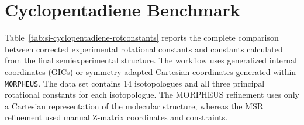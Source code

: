 \documentclass[12pt]{article}
\begin{document}
\section{Cyclopentadiene Benchmark}

Table~\ref{tab:si-cyclopentadiene-rotconstants} reports the complete
comparison between corrected experimental rotational constants and constants
calculated from the final semiexperimental structure. The workflow uses
generalized internal coordinates (GICs) or symmetry-adapted Cartesian
coordinates generated within \texttt{MORPHEUS}. The data set contains 14
isotopologues and all three principal rotational constants for each
isotopologue. The MORPHEUS refinement uses only a Cartesian representation of the
molecular structure, whereas the MSR refinement used manual Z-matrix
coordinates and constraints.
\end{document}
